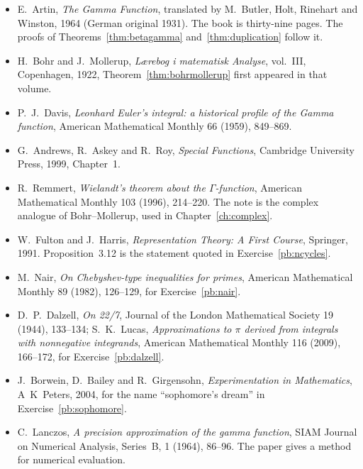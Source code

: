 \begin{itemize}
\item E.~Artin, \emph{The Gamma Function}, translated by M.~Butler, Holt, Rinehart and Winston, 1964 (German original 1931).
The book is thirty-nine pages. The proofs of Theorems~\ref{thm:betagamma} and~\ref{thm:duplication} follow it.
\item H.~Bohr and J.~Mollerup, \emph{L\ae{}rebog i matematisk Analyse}, vol.~III, Copenhagen, 1922, Theorem~\ref{thm:bohrmollerup} first appeared in that volume.
\item P.~J.~Davis, \emph{Leonhard Euler's integral: a historical profile of the Gamma function}, American Mathematical Monthly
66 (1959), 849--869.
\item G.~Andrews, R.~Askey and R.~Roy, \emph{Special Functions}, Cambridge University Press, 1999, Chapter~1.
\item R.~Remmert, \emph{Wielandt's theorem about the $\Gamma$-function}, American Mathematical Monthly 103 (1996), 214--220. The note is the complex analogue of Bohr--Mollerup, used in Chapter~\ref{ch:complex}.
\item W.~Fulton and J.~Harris, \emph{Representation Theory: A First Course}, Springer, 1991. Proposition~3.12 is the statement quoted in Exercise~\ref{pb:ncycles}.
\item M.~Nair, \emph{On Chebyshev-type inequalities for primes}, American Mathematical Monthly 89 (1982), 126--129, for
Exercise~\ref{pb:nair}.
\item D.~P.~Dalzell, \emph{On 22/7}, Journal of the London Mathematical Society 19 (1944), 133--134; S.~K.~Lucas,
\emph{Approximations to $\pi$ derived from integrals with nonnegative integrands}, American Mathematical Monthly 116 (2009),
166--172, for Exercise~\ref{pb:dalzell}.
\item J.~Borwein, D.~Bailey and R.~Girgensohn, \emph{Experimentation in Mathematics}, A~K~Peters, 2004, for the name
``sophomore's dream'' in Exercise~\ref{pb:sophomore}.
\item C.~Lanczos, \emph{A precision approximation of the gamma function}, SIAM Journal on Numerical Analysis, Series~B, 1
(1964), 86--96. The paper gives a method for numerical evaluation.
\end{itemize}
